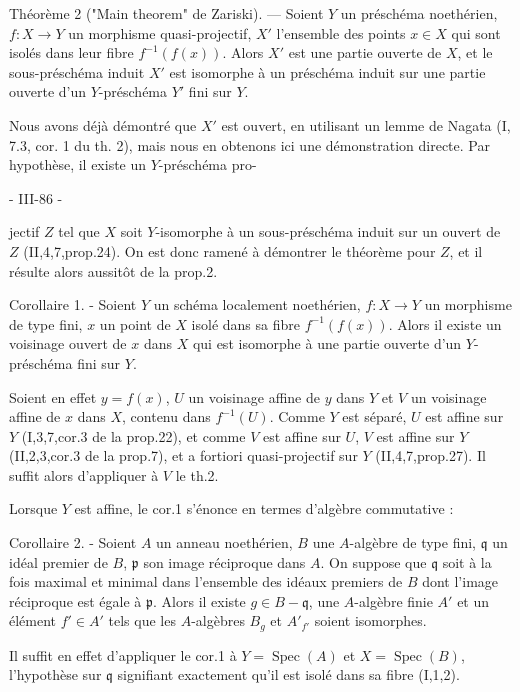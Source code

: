 Théorème 2 ("Main theorem" de Zariski). — Soient $Y$ un préschéma noethérien, $f: X \to Y$ un morphisme quasi-projectif, $X'$ l'ensemble des points $x \in X$ qui sont isolés dans leur fibre $f^{-1}(f(x))$. Alors $X'$ est une partie ouverte de $X$, et le sous-préschéma induit $X'$ est isomorphe à un préschéma induit sur une partie ouverte d'un $Y$-préschéma $Y'$ fini sur $Y$.

Nous avons déjà démontré que $X'$ est ouvert, en utilisant un lemme de Nagata (I, 7.3, cor. 1 du th. 2), mais nous en obtenons ici une démonstration directe. Par hypothèse, il existe un $Y$-préschéma pro-

\newpage


- III-86 -

jectif $Z$ tel que $X$ soit $Y$-isomorphe à un sous-préschéma induit sur un ouvert de $Z$ (II,4,7,prop.24). On est donc ramené à démontrer le théorème pour $Z$, et il résulte alors aussitôt de la prop.2.

Corollaire 1. - Soient $Y$ un schéma localement noethérien, $f: X \to Y$ un morphisme de type fini, $x$ un point de $X$ isolé dans sa fibre $f^{-1}(f(x))$. Alors il existe un voisinage ouvert de $x$ dans $X$ qui est isomorphe à une partie ouverte d'un $Y$-préschéma fini sur $Y$.

Soient en effet $y=f(x)$, $U$ un voisinage affine de $y$ dans $Y$ et $V$ un voisinage affine de $x$ dans $X$, contenu dans $f^{-1}(U)$. Comme $Y$ est séparé, $U$ est affine sur $Y$ (I,3,7,cor.3 de la prop.22), et comme $V$ est affine sur $U$, $V$ est affine sur $Y$ (II,2,3,cor.3 de la prop.7), et a fortiori quasi-projectif sur $Y$ (II,4,7,prop.27). Il suffit alors d'appliquer à $V$ le th.2.

Lorsque $Y$ est affine, le cor.1 s'énonce en termes d'algèbre commutative :

Corollaire 2. - Soient $A$ un anneau noethérien, $B$ une $A$-algèbre de type fini, $\mathfrak{q}$ un idéal premier de $B$, $\mathfrak{p}$ son image réciproque dans $A$. On suppose que $\mathfrak{q}$ soit à la fois maximal et minimal dans l'ensemble des idéaux premiers de $B$ dont l'image réciproque est égale à $\mathfrak{p}$. Alors il existe $g \in B-\mathfrak{q}$, une $A$-algèbre finie $A'$ et un élément $f' \in A'$ tels que les $A$-algèbres $B_g$ et $A'_{f'}$ soient isomorphes.

Il suffit en effet d'appliquer le cor.1 à $Y=\operatorname{Spec}(A)$ et $X=\operatorname{Spec}(B)$, l'hypothèse sur $\mathfrak{q}$ signifiant exactement qu'il est isolé dans sa fibre (I,1,2).

